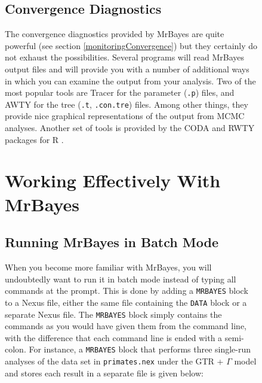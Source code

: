 \documentclass[12pt]{book}
\newcommand{\ttt}[1]{\texttt{#1}}
\begin{document}
\begin{figure}[h]
\subsection{Convergence Diagnostics}

The convergence diagnostics provided by MrBayes are quite powerful (see section
\ref{monitoringConvergence}) but they certainly do not exhaust the possibilities. Several programs
will read MrBayes output files and will provide you with a number of additional ways in which you
can examine the output from your analysis. Two of the most popular tools are Tracer
\citep{rambaut18} for the parameter (\ttt{.p}) files, and AWTY \citep{nylander07} for the tree
(\ttt{.t}, \ttt{.con.tre}) files. Among other things, they provide nice graphical representations
of the output from MCMC analyses. Another set of tools is provided by the CODA \citep{plummer06}
and RWTY \citep{warren17} packages for R \citep{rcoreteam18}.


\section{Working Effectively With MrBayes}

\subsection{Running MrBayes in Batch Mode}

When you become more familiar with MrBayes, you will undoubtedly want to run it in batch mode
instead of typing all commands at the prompt. This is done by adding a \ttt{MRBAYES} block to a
Nexus file, either the same file containing the \ttt{DATA} block or a separate Nexus file. The
\ttt{MRBAYES} block simply contains the commands as you would have given them from the command
line, with the difference that each command line is ended with a semi-colon. For instance, a
\ttt{MRBAYES} block that performs three single-run analyses of the data set in \ttt{primates.nex}
under the GTR + $\Gamma$ model and stores each result in a separate file is given below:


\end{figure}
\end{document}
